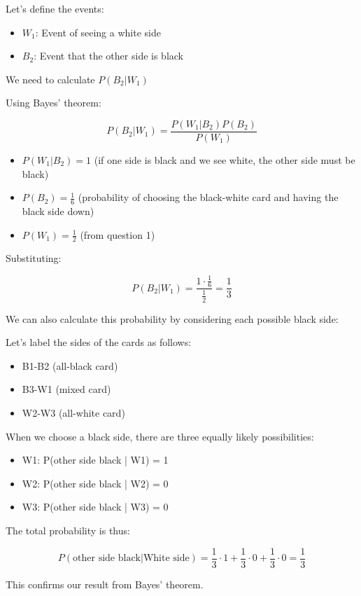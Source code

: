 \documentclass[addpoints]{exam}
\begin{document}
Let's define the events:
\begin{itemize}
    \item $W_1$: Event of seeing a white side
    \item $B_2$: Event that the other side is black
\end{itemize}

We need to calculate $P(B_2|W_1)$

Using Bayes' theorem:

\[P(B_2|W_1) = \frac{P(W_1|B_2)P(B_2)}{P(W_1)}\]

\begin{itemize}
    \item $P(W_1|B_2) = 1$ (if one side is black and we see white, the other side must be black)
    \item $P(B_2) = \frac{1}{6}$ (probability of choosing the black-white card and having the black side down)
    \item $P(W_1) = \frac{1}{2}$ (from question 1)
\end{itemize}

Substituting:

\[P(B_2|W_1) = \frac{1 \cdot \frac{1}{6}}{\frac{1}{2}} = \boxed{\frac{1}{3}} \]

We can also calculate this probability by considering each possible black side:

Let's label the sides of the cards as follows:
\begin{itemize}
    \item B1-B2 (all-black card)
    \item B3-W1 (mixed card)
    \item W2-W3 (all-white card)
\end{itemize}

When we choose a black side, there are three equally likely possibilities:
\begin{itemize}
    \item W1: P(other side black | W1) = 1
    \item W2: P(other side black | W2) = 0
    \item W3: P(other side black | W3) = 0
\end{itemize}

The total probability is thus:

\[ P(\text{other side black} | \text{White side}) = \frac{1}{3} \cdot 1 + \frac{1}{3} \cdot 0 + \frac{1}{3} \cdot 0 = \frac{1}{3} \]

This confirms our result from Bayes' theorem.
\end{document}
